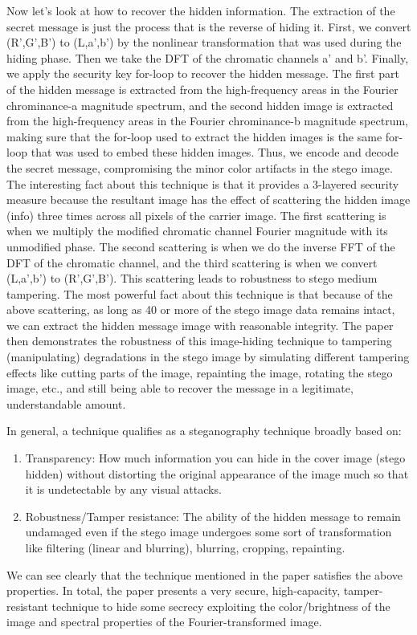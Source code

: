Now let's look at how to recover the hidden information. The extraction of the secret message is just the process that is the reverse of hiding it. First, we convert (R',G',B') to (L,a',b') by the nonlinear transformation that was used during the hiding phase. Then we take the DFT of the chromatic channels a' and b'. Finally, we apply the security key for-loop to recover the hidden message. The first part of the hidden message is extracted from the high-frequency areas in the Fourier chrominance-a magnitude spectrum, and the second hidden image is extracted from the high-frequency areas in the Fourier chrominance-b magnitude spectrum, making sure that the for-loop used to extract the hidden images is the same for-loop that was used to embed these hidden images. Thus, we encode and decode the secret message, compromising the minor color artifacts in the stego image. The interesting fact about this technique is that it provides a 3-layered security measure because the resultant image has the effect of scattering the hidden image (info) three times across all pixels of the carrier image. The first scattering is when we multiply the modified chromatic channel Fourier magnitude with its unmodified phase. The second scattering is when we do the inverse FFT of the DFT of the chromatic channel, and the third scattering is when we convert (L,a',b') to (R',G',B'). This scattering leads to robustness to stego medium tampering. The most powerful fact about this technique is that because of the above scattering, as long as 40 or more of the stego image data remains intact, we can extract the hidden message image with reasonable integrity. The paper then demonstrates the robustness of this image-hiding technique to tampering (manipulating) degradations in the stego image by simulating different tampering effects like cutting parts of the image, repainting the image, rotating the stego image, etc., and still being able to recover the message in a legitimate, understandable amount.

In general, a technique qualifies as a steganography technique broadly based on:
\begin{enumerate}
  \item Transparency: How much information you can hide in the cover image (stego hidden) without distorting the original appearance of the image much so that it is undetectable by any visual attacks.
  \item Robustness/Tamper resistance: The ability of the hidden message to remain undamaged even if the stego image undergoes some sort of transformation like filtering (linear and blurring), blurring, cropping, repainting.
\end{enumerate}
We can see clearly that the technique mentioned in the paper satisfies the above properties. In total, the paper presents a very secure, high-capacity, tamper-resistant technique to hide some secrecy exploiting the color/brightness of the image and spectral properties of the Fourier-transformed image.
